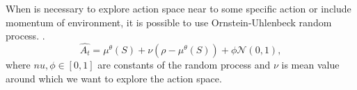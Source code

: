 When is necessary to explore action space near to some specific action or include momentum of environment, it is possible to use Ornstein-Uhlenbeck random process. \citep{lilicrap2015}. 
\begin{equation}
\hat{A_t} = \mu^\theta(S)  + \nu (\rho - \mu^\theta(S)) + \phi \mathcal{N}(0, 1),
\end{equation}
where $nu, \phi \in [0, 1]$ are constants of the random process and $\nu$ is mean value around which we want to explore the action space. 